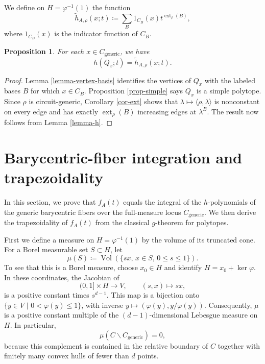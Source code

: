 \documentclass[12pt]{amsart}
\newtheorem{proposition}[theorem]{Proposition}
\numberwithin{equation}{section}
\numberwithin{theorem}{section}
\newcommand{\op}{\operatorname}
\begin{document}
We define on $H=\varphi^{-1}(1)$ the function
\begin{equation}
  \tilde{h}_{A,\rho}(x;t)\coloneqq \sum_{B}{1_{C_B}(x)}t^{\op{ext}_\rho(B)},
\end{equation}
where $1_{C_B}(x)$ is the indicator function of $C_B$.

\begin{proposition}
  \label{prop-fiber-h}
  For each $x\in C_{\mathrm{generic}}$, we have
  \begin{equation}
    h(Q_x;t)=\tilde{h}_{A,\rho}(x;t).
  \end{equation}
\end{proposition}
\begin{proof}
  Lemma \ref{lemma-vertex-basis} identifies the vertices of $Q_x$ with the labeled bases $B$ for which $x\in C_B$.
  Proposition \ref{prop-simple} says $Q_x$ is a simple polytope.
  Since $\rho$ is circuit-generic, Corollary \ref{cor-ext} shows that $\lambda\mapsto\langle\rho,\lambda\rangle$ is nonconstant on every edge and has exactly $\op{ext}_\rho(B)$ increasing edges at $\lambda^B$.
  The result now follows from Lemma \ref{lemma-h}.
\end{proof}



\section{Barycentric-fiber integration and trapezoidality}
\label{sec-integration}

In this section, we prove that $f_A(t)$ equals the integral of the $h$-polynomials of the generic barycentric fibers over the full-measure locus $C_{\mathrm{generic}}$. We then derive the trapezoidality of $f_A(t)$ from the classical $g$-theorem for polytopes.

First we define a measure on $H=\varphi^{-1}(1)$ by the volume of its truncated cone. For a Borel measurable set $S\subset H$, let
\begin{equation}
  \mu(S)\coloneqq \op{Vol}(\{sx,\,x\in S,\, 0\leq s\leq1\}).
\end{equation}
To see that this is a Borel measure, choose $x_0\in H$ and identify $H=x_0+\op{ker}\varphi$. In these coordinates, the Jacobian of
\begin{equation*}
  (0,1]\times H\longrightarrow V,\qquad (s,x)\longmapsto sx,
\end{equation*}
is a positive constant times $s^{d-1}$. This map is a bijection onto $\{y\in V \,\,|\,\, 0<\varphi(y)\leq1\}$, with inverse $y\mapsto(\varphi(y),y/\varphi(y))$. Consequently, $\mu$ is a positive constant multiple of the $(d-1)$-dimensional Lebesgue measure on $H$. In particular,
\begin{equation}
  \label{eq-generic-full-measure}
  \mu(C\backslash C_{\mathrm{generic}})=0,
\end{equation}
because this complement is contained in the relative boundary of $C$ together with finitely many convex hulls of fewer than $d$ points.
\end{document}
